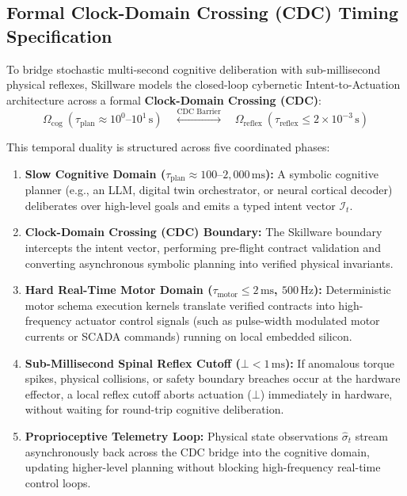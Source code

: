 \subsection{Formal Clock-Domain Crossing (CDC) Timing Specification}
\label{subsec:formal_cdc_timing}

To bridge stochastic multi-second cognitive deliberation with sub-millisecond physical reflexes, Skillware models the closed-loop cybernetic Intent-to-Actuation architecture across a formal \textbf{Clock-Domain Crossing (CDC)}:
\begin{equation}
\label{eq:cdc_duality}
\Omega_{\text{cog}} \ \left(\tau_{\text{plan}} \approx 10^0\text{--}10^1\,\text{s}\right) \quad\overset{\text{CDC Barrier}}{\longleftrightarrow}\quad \Omega_{\text{reflex}} \ \left(\tau_{\text{reflex}} \le 2\times 10^{-3}\,\text{s}\right)
\end{equation}

This temporal duality is structured across five coordinated phases:
\begin{enumerate}[leftmargin=*]
  \item \textbf{Slow Cognitive Domain ($\tau_{\text{plan}} \approx 100\text{--}2{,}000\,\text{ms}$):} A symbolic cognitive planner (e.g., an LLM, digital twin orchestrator, or neural cortical decoder) deliberates over high-level goals and emits a typed intent vector $\mathcal{I}_t$.
  \item \textbf{Clock-Domain Crossing (CDC) Boundary:} The Skillware boundary intercepts the intent vector, performing pre-flight contract validation and converting asynchronous symbolic planning into verified physical invariants.
  \item \textbf{Hard Real-Time Motor Domain ($\tau_{\text{motor}} \le 2\,\text{ms}$, $500\,\text{Hz}$):} Deterministic motor schema execution kernels translate verified contracts into high-frequency actuator control signals (such as pulse-width modulated motor currents or SCADA commands) running on local embedded silicon.
  \item \textbf{Sub-Millisecond Spinal Reflex Cutoff ($\bot < 1\,\text{ms}$):} If anomalous torque spikes, physical collisions, or safety boundary breaches occur at the hardware effector, a local reflex cutoff aborts actuation ($\bot$) immediately in hardware, without waiting for round-trip cognitive deliberation.
  \item \textbf{Proprioceptive Telemetry Loop:} Physical state observations $\hat{\sigma}_t$ stream asynchronously back across the CDC bridge into the cognitive domain, updating higher-level planning without blocking high-frequency real-time control loops.
\end{enumerate}

